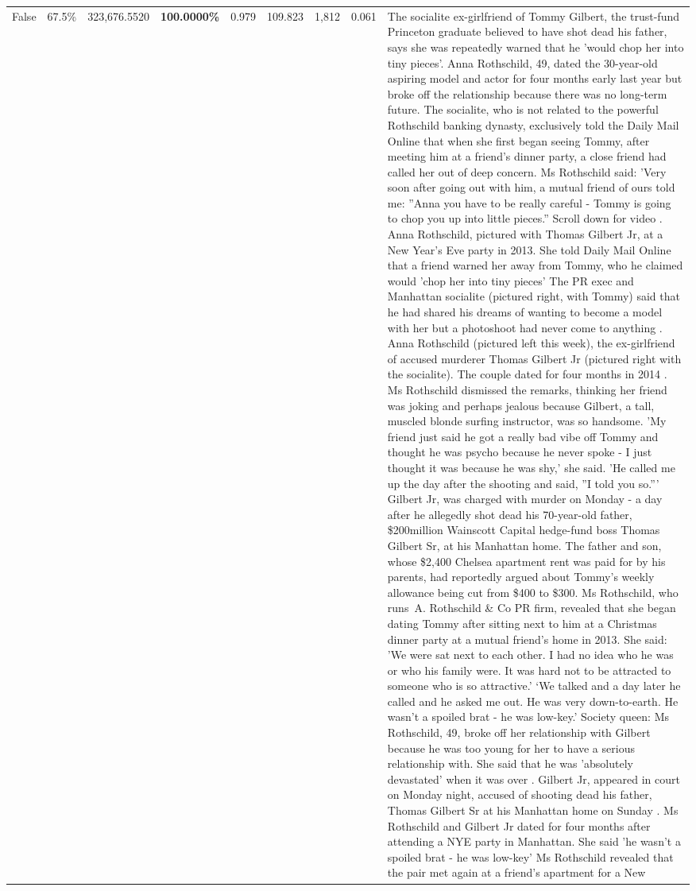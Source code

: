 \begin{table}[H]
\begin{tabular}{lllrlllll}
False & 67.5\% & 323,676.5520 & \bfseries \color{red} 100.0000\% & 0.979 & 109.823 & 1,812 & 0.061 & The socialite ex-girlfriend of Tommy Gilbert, the trust-fund Princeton graduate believed to have shot dead his father, says she was repeatedly warned that he 'would chop her into tiny pieces'. Anna Rothschild, 49, dated the 30-year-old aspiring model and actor for four months early last year but broke off the relationship because there was no long-term future. The socialite, who is not related to the powerful Rothschild banking dynasty, exclusively told the Daily Mail Online that when she first began seeing Tommy, after meeting him at a friend's dinner party, a close friend had called her out of deep concern. Ms Rothschild said: 'Very soon after going out with him, a mutual friend of ours told me: ''Anna you have to be really careful - Tommy is going to chop you up into little pieces.'' Scroll down for video . Anna Rothschild, pictured with Thomas Gilbert Jr, at a New Year's Eve party in 2013. She told Daily Mail Online that a friend warned her away from Tommy, who he claimed would 'chop her into tiny pieces' The PR exec and Manhattan socialite (pictured right, with Tommy) said that he had shared his dreams of wanting to become a model with her but a photoshoot had never come to anything . Anna Rothschild (pictured left this week), the ex-girlfriend of accused murderer Thomas Gilbert Jr (pictured right with the socialite). The couple dated for four months in 2014 . Ms Rothschild dismissed the remarks, thinking her friend was joking and perhaps jealous because Gilbert, a tall, muscled blonde surfing instructor, was so handsome. 'My friend just said he got a really bad vibe off Tommy and thought he was psycho because he never spoke - I just thought it was because he was shy,' she said. 'He called me up the day after the shooting and said, ''I told you so.''' Gilbert Jr, was charged with murder on Monday - a day after he allegedly shot dead his 70-year-old father, \$200million Wainscott Capital hedge-fund boss Thomas Gilbert Sr, at his Manhattan home. The father and son, whose \$2,400 Chelsea apartment rent was paid for by his parents, had reportedly argued about Tommy's weekly allowance being cut from \$400 to \$300. Ms Rothschild, who runs A. Rothschild \& Co PR firm, revealed that she began dating Tommy after sitting next to him at a Christmas dinner party at a mutual friend's home in 2013. She said: 'We were sat next to each other. I had no idea who he was or who his family were. It was hard not to be attracted to someone who is so attractive.' ‘We talked and a day later he called and he asked me out. He was very down-to-earth. He wasn’t a spoiled brat - he was low-key.’ Society queen: Ms Rothschild, 49, broke off her relationship with Gilbert because he was too young for her to have a serious relationship with. She said that he was 'absolutely devastated' when it was over . Gilbert Jr, appeared in court on Monday night, accused of shooting dead his father, Thomas Gilbert Sr at his Manhattan home on Sunday . Ms Rothschild and Gilbert Jr dated for four months after attending a NYE party in Manhattan. She said 'he wasn't a spoiled brat - he was low-key' Ms Rothschild revealed that the pair met again at a friend’s apartment for a New 
\end{tabular}
\end{table}
